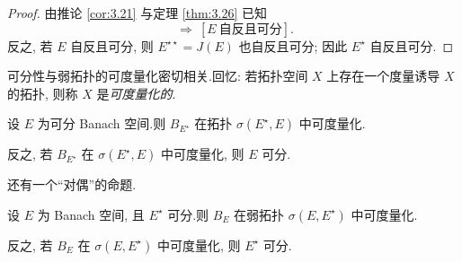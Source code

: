 \begin{proof}
由推论  \ref{cor:3.21} 与定理  \ref{thm:3.26} 已知
\begin{equation*}
[E^\star\ \text{自反且可分}]\ \Rightarrow\ [E\ \text{自反且可分}].
\end{equation*}
反之, 若 $E$ 自反且可分, 则 $E^{\star\star}=J(E)$ 也自反且可分; 因此 $E^\star$
自反且可分.
\end{proof}

可分性与弱拓扑的可度量化密切相关.回忆: 若拓扑空间 $X$ 上存在一个度量诱导 $X$
的拓扑, 则称 $X$ 是\emph{可度量化的}.

\begin{theorem}
\label{thm:3.28}
设 $E$ 为可分 Banach 空间.则 $B_{E^\star}$ 在\wstar{}拓扑
$\sigma(E^\star,E)$ 中可度量化.

反之, 若 $B_{E^\star}$ 在 $\sigma(E^\star,E)$ 中可度量化, 则 $E$ 可分.
\end{theorem}

还有一个``对偶''的命题.

\begin{theorem}
\label{thm:3.29}
设 $E$ 为 Banach 空间, 且 $E^\star$ 可分.则 $B_E$ 在弱拓扑
$\sigma(E,E^\star)$ 中可度量化.

反之, 若 $B_E$ 在 $\sigma(E,E^\star)$ 中可度量化, 则 $E^\star$ 可分.
\end{theorem}

